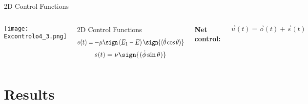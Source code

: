 \documentclass{beamer}
\begin{document}
\begin{frame}[t]{2D Control Functions}
    
     \begin{columns}
             \centering
             \texttt{[image: Excontrolo4\_3.png]}
             
             \begin{block}{2D Control Functions}
               \vspace*{-\baselineskip}\setlength\belowdisplayshortskip{0pt}
               \begin{equation}  
               \scalebox{0.85}[1]{$ o(t)=-\mu  \sign\left({E_1-E}\right)\sign{(\dot{\theta} \cos{\theta})}$} 
                 \label{controlu2d}
               \end{equation}
               \begin{equation}
                 s(t)=\nu \sign{(\dot{\phi}\sin{\theta})}
                 \label{controlv2d}
               \end{equation}
             \end{block}
            \vspace{1 cm}
            \textbf{Net control:} 
             
               \begin{equation}
                 \Vec{u}(t)=\Vec{o}(t)+\Vec{s}(t)
               \end{equation}
           
     \end{columns}

\end{frame}

\section{Results}
\end{document}

